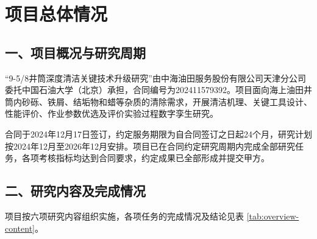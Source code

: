 \begingroup
\renewcommand{\thetable}{\arabic{table}}
\setcounter{table}{0}

\chapter*{项目总体情况}

\section*{一、项目概况与研究周期}

“9-5/8\inch{}井筒深度清洁关键技术升级研究”由中海油田服务股份有限公司天津分公司委托中国石油大学（北京）承担，合同编号为202411579392。项目面向海上油田井筒内砂砾、铁屑、结垢物和蜡等杂质的清除需求，开展清洁机理、关键工具设计、性能评价、作业参数优选及评价实验过程数字孪生研究。

合同于2024年12月17日签订，约定服务期限为自合同签订之日起24个月，研究计划按2024年12月至2026年12月安排。项目已在合同约定研究周期内完成全部研究任务，各项考核指标均达到合同要求，约定成果已全部形成并提交甲方。

\section*{二、研究内容及完成情况}

项目按六项研究内容组织实施，各项任务的完成情况及结论见表 \ref{tab:overview-content}。

